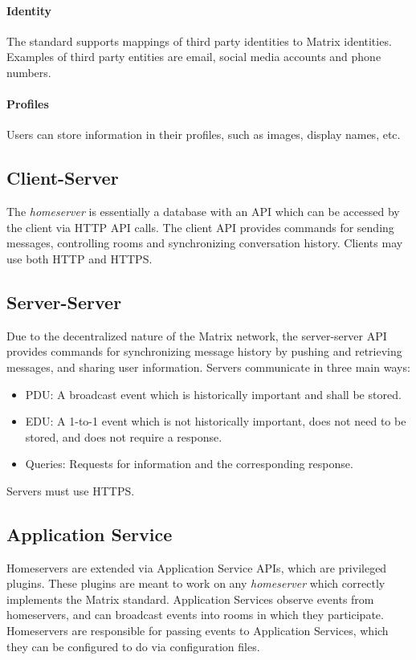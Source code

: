 \paragraph{Identity}
The standard supports mappings of third party identities to Matrix identities.
Examples of third party entities are email, social media accounts and phone numbers.

\paragraph{Profiles}
Users can store information in their profiles, such as images, display names, etc.

\subsection{Client-Server}
The \textit{homeserver} is essentially a database with an \ac{API} which can be accessed by the client via \ac{HTTP} \ac{API} calls.
The client \ac{API} provides commands for sending messages, controlling rooms and synchronizing conversation history.
Clients may use both \ac{HTTP} and \ac{HTTPS}.

\subsection{Server-Server}
Due to the decentralized nature of the Matrix network, the server-server \ac{API} provides commands for synchronizing message history by pushing and retrieving messages, and sharing user information.
Servers communicate in three main ways:
\begin{itemize}
    \item \ac{PDU}: A broadcast event which is historically important and shall be stored.
    \item \ac{EDU}: A 1-to-1 event which is not historically important, does not need to be stored, and does not require a response.
    \item Queries: Requests for information and the corresponding response.
\end{itemize}
Servers must use \ac{HTTPS}.

\subsection{Application Service}
Homeservers are extended via Application Service \ac{API}s, which are privileged plugins.
These plugins are meant to work on any \textit{homeserver} which correctly implements the Matrix standard.
Application Services observe events from homeservers, and can broadcast events into rooms in which they participate.
Homeservers are responsible for passing events to Application Services, which they can be configured to do via configuration files.

